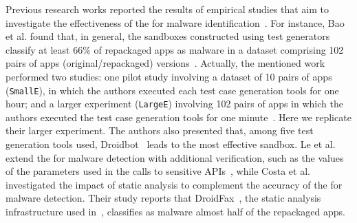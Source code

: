 






Previous research works reported the results of empirical studies that aim to investigate the effectiveness of
the \mas for malware identification~\cite{DBLP:conf/wcre/BaoLL18,DBLP:conf/scam/CostaMCMVBC20}.
For instance, Bao et al. found that, in general, the sandboxes constructed using test generators classify at least 66\% of repackaged apps as malware in a dataset comprising 102 pairs of apps (original/repackaged) versions~\cite{DBLP:conf/wcre/BaoLL18}.
{\color{blue}Actually, the mentioned work performed two studies: one pilot study involving a dataset
of 10 pairs of apps (\texttt{SmallE}), in which the authors executed each test case generation tools for one hour; and a larger experiment
(\texttt{LargeE}) involving 102 pairs of
apps in which the authors executed the test case generation tools for one minute~\cite{DBLP:conf/wcre/BaoLL18}.}
Here we replicate their larger experiment. 
The authors also presented that, among five test generation tools used, Droidbot~\cite{DBLP:conf/icse/LiYGC17} leads to the most effective sandbox.
Le et al. extend the \mas for malware detection with additional verification,
such as the values of the parameters used in the
calls to sensitive APIs~\cite{le2018towards}, while
Costa et al.\cite{DBLP:journals/jss/CostaMMSSBNR22} investigated the impact of static analysis to complement the accuracy of the \mas
for malware detection. Their study reports that DroidFax~\cite{DBLP:conf/icsm/CaiR17a}, the static analysis infrastructure used in~\cite{DBLP:conf/wcre/BaoLL18}, classifies as malware almost half of the repackaged apps.

